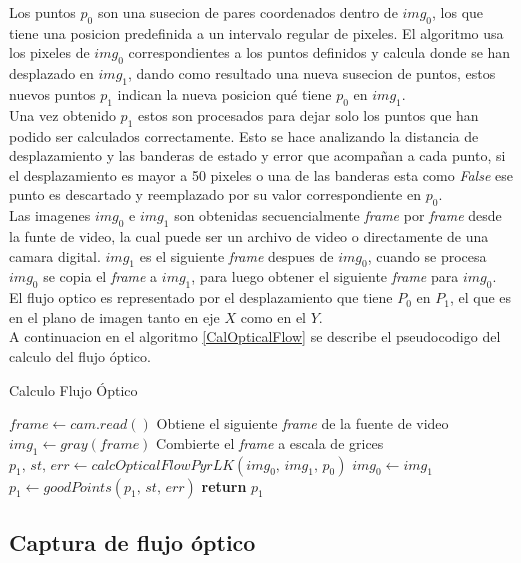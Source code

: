 \documentclass{iccmemoria}
\begin{document}
Los puntos $p_0$ son una susecion de pares coordenados dentro de $img_0$, los que tiene una posicion predefinida a un intervalo regular de pixeles. El algoritmo usa los pixeles de $img_0$ correspondientes a los puntos definidos y calcula donde se han desplazado en $img_1$, dando como resultado una nueva susecion de puntos, estos nuevos puntos $p_1$ indican la nueva posicion qué tiene $p_0$ en $img_1$.\\

Una vez obtenido $p_1$ estos son procesados para dejar solo los puntos que han podido ser calculados correctamente. Esto se hace analizando la distancia de desplazamiento y las banderas de estado y error que acompañan a cada punto, si el desplazamiento es mayor a 50 pixeles o una de las banderas esta como \emph{False} ese punto es descartado y reemplazado por su valor correspondiente en $p_0$.\\

Las imagenes $img_0$ e $img_1$ son obtenidas secuencialmente \emph{frame} por \emph{frame} desde la funte de video, la cual puede ser un archivo de video o directamente de una camara digital. $img_1$ es el siguiente \emph{frame} despues de $img_0$, cuando se procesa $img_0$ se copia el \emph{frame} a $img_1$, para luego obtener el siguiente \emph{frame} para $img_0$.\\

El flujo optico es representado por el desplazamiento que tiene $P_0$ en $P_1$, el que es en el plano de imagen tanto en eje $X$ como en el $Y$.\\

A continuacion en el algoritmo \ref{CalOpticalFlow} se describe el pseudocodigo del calculo del flujo óptico.

\begin{algorithm}
\caption{Calculo Flujo Óptico}\label{CalOpticalFlow}
\begin{algorithmic}[1]
\State $frame \gets cam.read()$ \Comment Obtiene el siguiente \emph{frame} de la fuente de video
\State $img_1 \gets gray(frame)$ \Comment Combierte el \emph{frame} a escala de grices
\State $p_1,\, st,\, err \gets calcOpticalFlowPyrLK(img_0,\, img_1,\, p_0) $
\State $img_0 \gets img_1$
\State $p_1 \gets goodPoints(p_1,\, st,\, err)$ \Comment 
\State \textbf{return} $p_1$

\EndFunction
\end{algorithmic}
\end{algorithm}
 
\subsection{Captura de flujo óptico}
\end{document}

